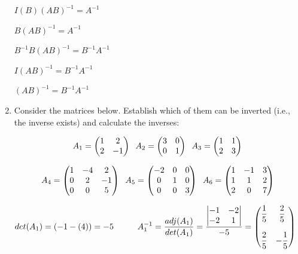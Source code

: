 \documentclass[fleqn]{article}
\begin{document}
\begin{enumerate}
    \textcolor{hwColor}{$I(B)(AB)^{-1}=A^{-1}$}

    \textcolor{hwColor}{$B(AB)^{-1}=A^{-1}$}

    \textcolor{hwColor}{$B^{-1}B(AB)^{-1}=B^{-1}A^{-1}$}

    \textcolor{hwColor}{$I(AB)^{-1}=B^{-1}A^{-1}$}

    \textcolor{hwColor}{$(AB)^{-1}=B^{-1}A^{-1}$}

    \bigbreak

    \item  Consider the matrices below. Establish which of them can be inverted (i.e., the inverse exists) and calculate the inverses: 

      $$A_1 = 
      \begin{pmatrix}
        1 & 2 \\
        2 & -1
      \end{pmatrix}\hskip 0.2truecm 
      A_2=\begin{pmatrix}
        3 & 0 \\
        0 & 1
      \end{pmatrix}\hskip 0.2truecm
      A_3=\begin{pmatrix}
        1 & 1 \\
        2 & 3
      \end{pmatrix}
      $$

      $$A_4 = 
      \begin{pmatrix}
        1 & -4 & 2 \\
        0 & 2 & -1 \\
        0 & 0 & 5
      \end{pmatrix}\hskip 0.2truecm 
      A_5=\begin{pmatrix}
        -2 & 0 & 0 \\
        0 & 1 & 0 \\
        0 & 0 & 3
      \end{pmatrix}\hskip 0.2truecm
      A_6=\begin{pmatrix}
        1 & -1 & 3 \\
        1 & 1 & 2 \\
        2 & 0 & 7
      \end{pmatrix}
      $$

      \textcolor{hwColor}{
        $
        det(A_1)=(-1-(4))=-5
        \hskip 1truecm
        A_1^{-1}=\dfrac{adj(A_1)}{det(A_1)}=\dfrac{
          \begin{vmatrix}
            -1 & -2 \\
            -2 & 1
          \end{vmatrix}
        }{-5}=\begin{pmatrix}
          \dfrac{1}{5} & \dfrac{2}{5} \\
          \\
          \dfrac{2}{5} & -\dfrac{1}{5} \\
        \end{pmatrix}
        $
      }


\end{enumerate}
\end{document}

